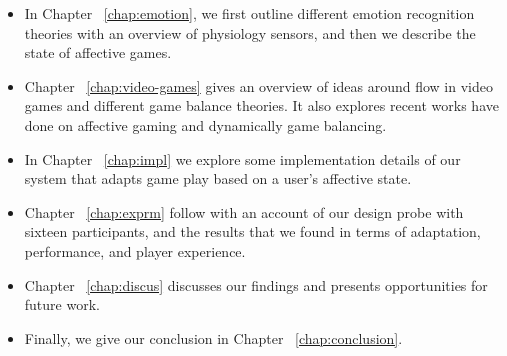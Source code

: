 \begin{itemize}
\item In Chapter ~\ref{chap:emotion}, we first outline different emotion recognition theories with an overview of physiology sensors, and then we describe the state of affective games.
\item Chapter ~\ref{chap:video-games} gives an overview of ideas around flow in video games and different game balance theories. It also explores recent works have done on affective gaming and dynamically game balancing.
\item In Chapter ~\ref{chap:impl} we explore some implementation details of our system that adapts game play based on a user's affective state.
\item Chapter ~\ref{chap:exprm} follow with an account of our design probe with sixteen participants, and the results that we found in terms of adaptation, performance, and player experience.
\item Chapter ~\ref{chap:discus} discusses our findings and presents opportunities for future work.
\item Finally, we give our conclusion in Chapter ~\ref{chap:conclusion}.
\end{itemize}
